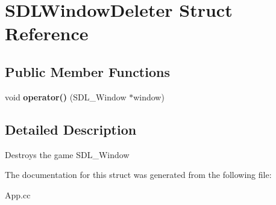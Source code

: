 \hypertarget{structSDLWindowDeleter}{}\section{S\+D\+L\+Window\+Deleter Struct Reference}
\label{structSDLWindowDeleter}
\subsection*{Public Member Functions}
\begin{DoxyCompactItemize}
\item 
\hypertarget{structSDLWindowDeleter_a2aedcc99c3756ae090c38badabeb10b1}{}void {\bfseries operator()} (S\+D\+L\+\_\+\+Window $\ast$window)\label{structSDLWindowDeleter_a2aedcc99c3756ae090c38badabeb10b1}

\end{DoxyCompactItemize}


\subsection{Detailed Description}
Destroys the game S\+D\+L\+\_\+\+Window 

The documentation for this struct was generated from the following file\+:\begin{DoxyCompactItemize}
\item 
App.\+cc\end{DoxyCompactItemize}
